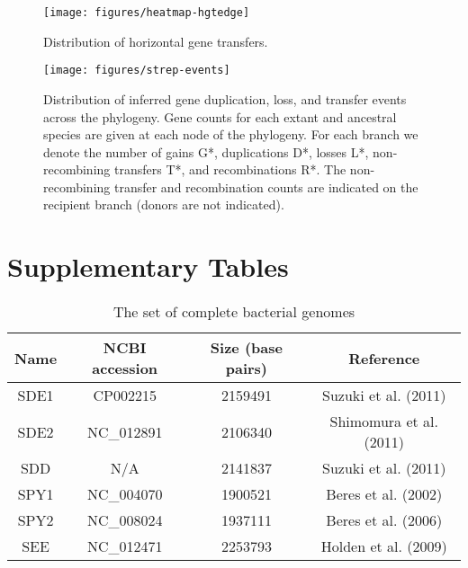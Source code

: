 \documentclass[english]{article}
\providecommand{\tabularnewline}{\\}
\begin{document}
\begin{figure}
\begin{center}
\texttt{[image: figures/heatmap-hgtedge]}
\end{center}
\vspace{-1.2in}
\caption{Distribution of horizontal gene transfers.}
\label{fig:hgt-heatmap}
\end{figure}

\begin{figure}
\texttt{[image: figures/strep-events]}
\caption{\label{fig:Gene-duplication-loss} Distribution of inferred
  gene duplication, loss, and transfer events across the phylogeny.
  Gene counts for each extant and ancestral species are given at each
  node of the phylogeny.  For each branch we denote the number of gains
  G*, duplications D*, losses L*, non-recombining transfers T*, and 
  recombinations R*.  The non-recombining transfer and recombination counts
  are indicated on the recipient branch (donors are not indicated).}
\end{figure}
\clearpage{}%


\clearpage{}\setcounter{figure}{0}
\setcounter{table}{0}
\renewcommand{\figurename}{Supplementary Figure}
\renewcommand{\tablename}{Supplementary Table}

\section*{Supplementary Tables}
\clearpage{}

\begin{table}
\caption{\label{tab:genome}The set of complete bacterial genomes}
\noindent \begin{centering}
\begin{tabular}{cccc}
\hline 
Name & NCBI accession & Size (base pairs) & Reference\tabularnewline
\hline
SDE1 & CP002215 & 2159491 & Suzuki et al. (2011)\tabularnewline
SDE2 & NC\_012891 & 2106340 & Shimomura et al. (2011)\tabularnewline
SDD & N/A & 2141837 & Suzuki et al. (2011)\tabularnewline
SPY1 & NC\_004070 & 1900521 & Beres et al. (2002)\tabularnewline
SPY2 & NC\_008024 & 1937111 & Beres et al. (2006)\tabularnewline
SEE & NC\_012471 & 2253793 & Holden et al. (2009)\tabularnewline
\hline
\end{tabular}
\par\end{centering}
\end{table}
\clearpage{}
\end{document}
